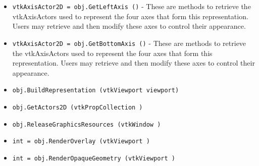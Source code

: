 \begin{itemize}
\item  \verb|vtkAxisActor2D = obj.GetLeftAxis ()| -  These are methods to retrieve the vtkAxisActors used to represent
 the four axes that form this representation. Users may retrieve and
 then modify these axes to control their appearance.

\item  \verb|vtkAxisActor2D = obj.GetBottomAxis ()| -  These are methods to retrieve the vtkAxisActors used to represent
 the four axes that form this representation. Users may retrieve and
 then modify these axes to control their appearance.

\item  \verb|obj.BuildRepresentation (vtkViewport viewport)|

\item  \verb|obj.GetActors2D (vtkPropCollection )|

\item  \verb|obj.ReleaseGraphicsResources (vtkWindow )|

\item  \verb|int = obj.RenderOverlay (vtkViewport )|

\item  \verb|int = obj.RenderOpaqueGeometry (vtkViewport )|

\end{itemize}
